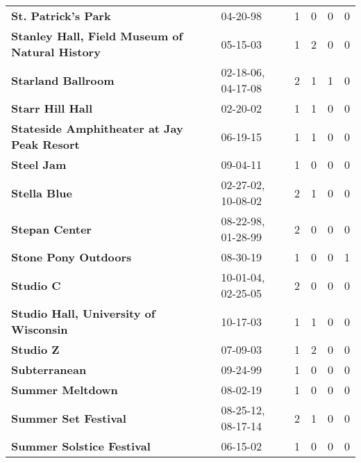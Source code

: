 \begin{supertabular}{llllll}
                                          \textbf{St. Patrick's Park} &                      04-20-98 &  1 &   0 &  0 &  0 \\
               \textbf{Stanley Hall, Field Museum of Natural History} &                      05-15-03 &  1 &   2 &  0 &  0 \\
                                           \textbf{Starland Ballroom} &            02-18-06, 04-17-08 &  2 &   1 &  1 &  0 \\
                                             \textbf{Starr Hill Hall} &                      02-20-02 &  1 &   1 &  0 &  0 \\
                   \textbf{Stateside Amphitheater at Jay Peak Resort} &                      06-19-15 &  1 &   1 &  0 &  0 \\
                                                   \textbf{Steel Jam} &                      09-04-11 &  1 &   0 &  0 &  0 \\
                                                 \textbf{Stella Blue} &            02-27-02, 10-08-02 &  2 &   1 &  0 &  0 \\
                                               \textbf{Stepan Center} &            08-22-98, 01-28-99 &  2 &   0 &  0 &  0 \\
                                         \textbf{Stone Pony Outdoors} &                      08-30-19 &  1 &   0 &  0 &  1 \\
                                                    \textbf{Studio C} &            10-01-04, 02-25-05 &  2 &   0 &  0 &  0 \\
                        \textbf{Studio Hall, University of Wisconsin} &                      10-17-03 &  1 &   1 &  0 &  0 \\
                                                    \textbf{Studio Z} &                      07-09-03 &  1 &   2 &  0 &  0 \\
                                                \textbf{Subterranean} &                      09-24-99 &  1 &   0 &  0 &  0 \\
                                             \textbf{Summer Meltdown} &                      08-02-19 &  1 &   0 &  0 &  0 \\
                                         \textbf{Summer Set Festival} &            08-25-12, 08-17-14 &  2 &   1 &  0 &  0 \\
                                    \textbf{Summer Solstice Festival} &                      06-15-02 &  1 &   0 &  0 &  0 \\

\end{supertabular}
